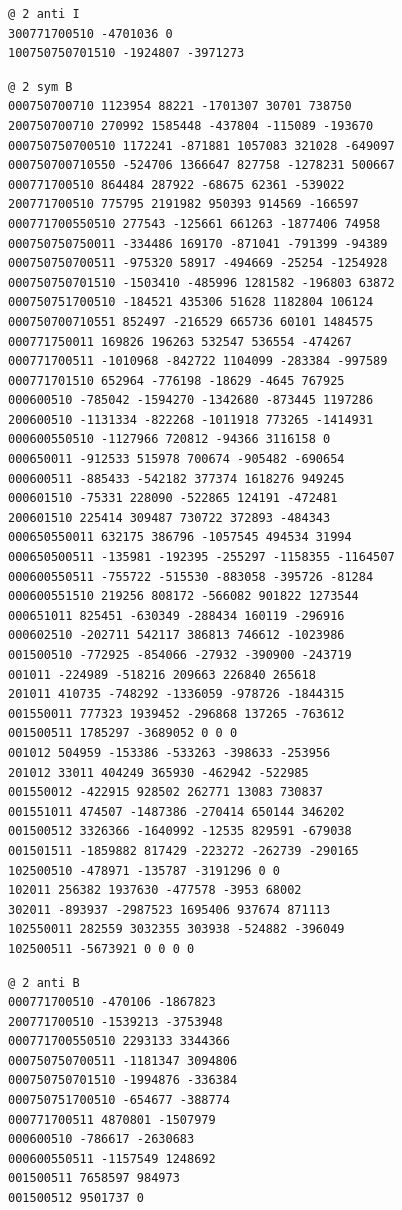 \begin{Verbatim}[fontsize=\footnotesize]
@ 2 anti I
300771700510 -4701036 0
100750750701510 -1924807 -3971273
\end{Verbatim}
\begin{Verbatim}[fontsize=\footnotesize]
@ 2 sym B
000750700710 1123954 88221 -1701307 30701 738750
200750700710 270992 1585448 -437804 -115089 -193670
000750750700510 1172241 -871881 1057083 321028 -649097
000750700710550 -524706 1366647 827758 -1278231 500667
000771700510 864484 287922 -68675 62361 -539022
200771700510 775795 2191982 950393 914569 -166597
000771700550510 277543 -125661 661263 -1877406 74958
000750750750011 -334486 169170 -871041 -791399 -94389
000750750700511 -975320 58917 -494669 -25254 -1254928
000750750701510 -1503410 -485996 1281582 -196803 63872
000750751700510 -184521 435306 51628 1182804 106124
000750700710551 852497 -216529 665736 60101 1484575
000771750011 169826 196263 532547 536554 -474267
000771700511 -1010968 -842722 1104099 -283384 -997589
000771701510 652964 -776198 -18629 -4645 767925
000600510 -785042 -1594270 -1342680 -873445 1197286
200600510 -1131334 -822268 -1011918 773265 -1414931
000600550510 -1127966 720812 -94366 3116158 0
000650011 -912533 515978 700674 -905482 -690654
000600511 -885433 -542182 377374 1618276 949245
000601510 -75331 228090 -522865 124191 -472481
200601510 225414 309487 730722 372893 -484343
000650550011 632175 386796 -1057545 494534 31994
000650500511 -135981 -192395 -255297 -1158355 -1164507
000600550511 -755722 -515530 -883058 -395726 -81284
000600551510 219256 808172 -566082 901822 1273544
000651011 825451 -630349 -288434 160119 -296916
000602510 -202711 542117 386813 746612 -1023986
001500510 -772925 -854066 -27932 -390900 -243719
001011 -224989 -518216 209663 226840 265618
201011 410735 -748292 -1336059 -978726 -1844315
001550011 777323 1939452 -296868 137265 -763612
001500511 1785297 -3689052 0 0 0
001012 504959 -153386 -533263 -398633 -253956
201012 33011 404249 365930 -462942 -522985
001550012 -422915 928502 262771 13083 730837
001551011 474507 -1487386 -270414 650144 346202
001500512 3326366 -1640992 -12535 829591 -679038
001501511 -1859882 817429 -223272 -262739 -290165
102500510 -478971 -135787 -3191296 0 0
102011 256382 1937630 -477578 -3953 68002
302011 -893937 -2987523 1695406 937674 871113
102550011 282559 3032355 303938 -524882 -396049
102500511 -5673921 0 0 0 0
\end{Verbatim}
\begin{Verbatim}[fontsize=\footnotesize]
@ 2 anti B
000771700510 -470106 -1867823
200771700510 -1539213 -3753948
000771700550510 2293133 3344366
000750750700511 -1181347 3094806
000750750701510 -1994876 -336384
000750751700510 -654677 -388774
000771700511 4870801 -1507979
000600510 -786617 -2630683
000600550511 -1157549 1248692
001500511 7658597 984973
001500512 9501737 0
\end{Verbatim}
